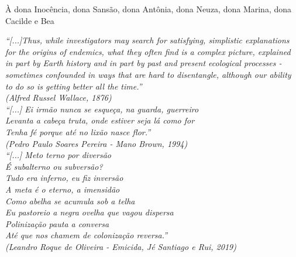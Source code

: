 \documentclass[12pt,openright,oneside,a4paper,english]{abntex2}
\begin{document}
\begin{dedicatoria}
	
	\flushright
	\begin{minipage}{.3\textwidth}
		\flushright
		\SingleSpacing
		\vspace*{18cm}
		À dona Inocência, dona Sansão, dona Antônia, dona Neuza, dona Marina, dona Cacilde e Bea
		\vspace*{\fill}
		
	\end{minipage}%


\end{dedicatoria}
\begin{epigrafe}
	\vspace*{\fill}
	\begin{flushright}
		\textit{“[...]Thus, while investigators may search for satisfying, simplistic explanations for the origins of endemics, what they often find is a complex picture, explained in part by Earth history and in part by past and present ecological processes - sometimes confounded in ways that are hard to disentangle, although our ability to do so is getting better all the time.”\\
			(Alfred Russel Wallace, 1876)\\
			\vspace{\onelineskip}
			“[...] Ei irmão nunca se esqueça, na guarda, guerreiro\\
			Levanta a cabeça truta, onde estiver seja lá como for\\
			Tenha fé porque até no lixão nasce flor.”\\
			(Pedro Paulo Soares Pereira - Mano Brown, 1994)\\
			\vspace{\onelineskip}
			“[...] Meto terno por diversão\\
			É subalterno ou subversão?\\
			Tudo era inferno, eu fiz inversão\\
			A meta é o eterno, a imensidão\\
			Como abelha se acumula sob a telha\\
			Eu pastoreio a negra ovelha que vagou dispersa\\
			Polinização pauta a conversa\\
			Até que nos chamem de colonização reversa.”\\
			(Leandro Roque de Oliveira - Emicida, Jé Santiago e Rui, 2019)}
	\end{flushright}
\end{epigrafe}
\end{document}

